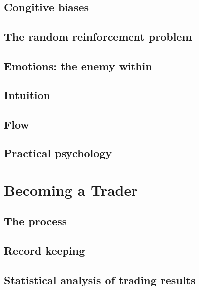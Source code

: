 \documentclass[10pt,twocolumn]{article}
\begin{document}
\subsection{Congitive biases}
\subsection{The random reinforcement problem}
\subsection{Emotions: the enemy within}
\subsection{Intuition}
\subsection{Flow}
\subsection{Practical psychology}

\section{Becoming a Trader}
\subsection{The process}
\subsection{Record keeping}
\subsection{Statistical analysis of trading results}
\end{document}
